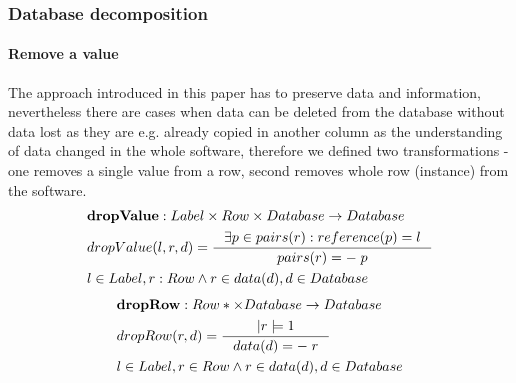 \documentclass[11pt]{article}
\begin{document}
\subsubsection{Database decomposition}
\paragraph{Remove a value}  The approach introduced in this paper has to  preserve data and information, nevertheless there are cases when data can be deleted from the database without data lost as they are e.g. already copied in another column as the understanding of data changed in the whole software, therefore we defined two transformations - one removes a single value from a row, second removes whole row (instance) from the software.
\begin{align*}
&	\mathbf{dropValue} : Label \times Row \times Database \rightarrow Database \\
&	dropValue(l, r, d) = \inference{\exists p \in pairs(r) : reference(p) = l}{pairs(r) =- \; p}\\ 
& l \in Label, r : Row \wedge r \in data(d), d \in Database
\end{align*}
\begin{align*}
&	\mathbf{dropRow} :  Row*  \times Database \rightarrow Database\\
&	dropRow(r, d) = \inference{|r|=1}{data(d) =- \; r}	\\ 
& l \in Label, r \in Row \wedge r \in data(d), d \in Database
\end{align*}
\end{document}
